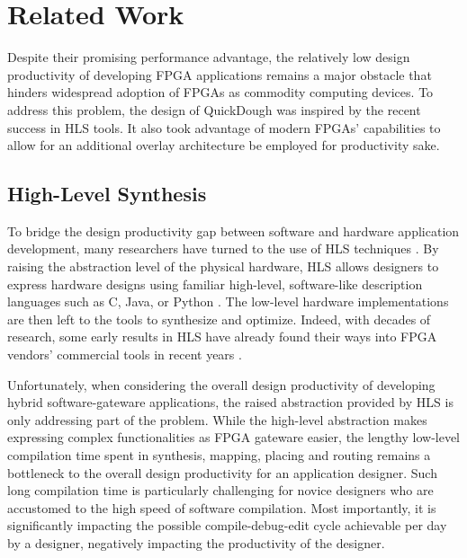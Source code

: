 \section{Related Work}\label{sec:relatedwork}
Despite their promising performance advantage, the relatively low design productivity of developing
FPGA applications remains a major obstacle that hinders widespread adoption of FPGAs as commodity
computing devices. To address this problem, the design of QuickDough was inspired by the recent success in HLS tools.
It also took advantage of modern FPGAs' capabilities to allow for an additional overlay architecture
be employed for productivity sake.

\subsection{High-Level Synthesis}
To bridge the design productivity gap between software and hardware application development, many researchers have turned to the use of HLS techniques \cite{cong2011high}.
By raising the abstraction level of the physical hardware, HLS allows designers to express hardware designs using familiar high-level, software-like description languages such as C, Java, or Python \cite{cardoso2010compiling,Canis:2011:LHS:1950413.1950423}.
The low-level hardware implementations are then left to the tools to synthesize and optimize.
Indeed, with decades of research, some early results in HLS have already found their ways into FPGA vendors' commercial tools in recent years \cite{chen2005xpilot, zhang2008autopilot, VivadoHLS}.

Unfortunately, when considering the overall design productivity of developing hybrid software-gateware applications, the raised abstraction provided by HLS is only addressing part of the problem.
While the high-level abstraction makes expressing complex functionalities as FPGA gateware easier, the lengthy low-level compilation time spent in synthesis, mapping, placing and routing remains a bottleneck to the overall design productivity for an application designer.
Such long compilation time is particularly challenging for novice designers who are accustomed to the high speed of software compilation.
Most importantly, it is significantly impacting the possible compile-debug-edit cycle achievable per day by a designer, negatively impacting the productivity of the designer.


